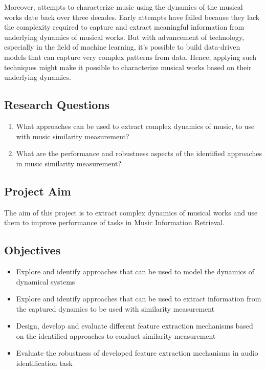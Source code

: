 \documentclass[../main.tex]{subfiles}
\begin{document}
\par
Moreover, attempts to characterize music using the dynamics of the musical works date back over three decades. Early attempts have failed because they lack the complexity required to capture and extract meaningful information from underlying dynamics of musical works. But with advancement of technology, especially in the field of machine learning, it's possible to build data-driven models that can capture very complex patterns from data. Hence, applying such techniques might make it possible to characterize musical works based on their underlying dynamics.


\subsection{Research Questions}

\normalsize
\begin{enumerate}
  \item What approaches can be used to extract complex dynamics of music, to use with music similarity measurement?
  \item What are the performance and robustness aspects of the identified approaches in music similarity measurement?
\end{enumerate}

\subsection{Project Aim}
The aim of this project is to extract complex dynamics of musical works and use them to improve performance of tasks in Music Information Retrieval.


\subsection{Objectives}
\begin{itemize}
  \item Explore and identify approaches that can be used to model the dynamics of dynamical systems
  \item Explore and identify approaches that can be used to extract information from the captured dynamics to be used with similarity measurement
  \item Design, develop and evaluate different feature extraction mechanisms based on the identified approaches to conduct similarity measurement
  \item Evaluate the robustness of developed feature extraction mechanisms in audio identification task
\end{itemize}
\end{document}
